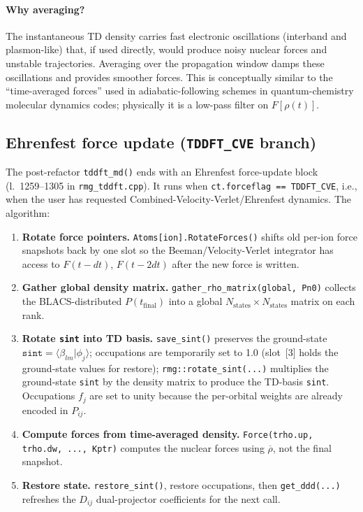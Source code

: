 \documentclass[11pt,letterpaper]{article}
\begin{document}
\paragraph{Why averaging?}  The instantaneous TD density carries fast
electronic oscillations (interband and plasmon-like) that, if used
directly, would produce noisy nuclear forces and unstable trajectories.
Averaging over the propagation window damps these oscillations and
provides smoother forces.  This is conceptually similar to the
``time-averaged forces'' used in adiabatic-following schemes in
quantum-chemistry molecular dynamics codes; physically it is a low-pass
filter on $F[\rho(t)]$.

\subsection{Ehrenfest force update (\texttt{TDDFT\_CVE} branch)}
\label{sec:cve}

The post-refactor \texttt{tddft\_md()} ends with an Ehrenfest force-update
block (l.~1259--1305 in \texttt{rmg\_tddft.cpp}).  It runs when
\texttt{ct.forceflag == TDDFT\_CVE}, i.e., when the user has requested
Combined-Velocity-Verlet/Ehrenfest dynamics.  The algorithm:

\begin{enumerate}[leftmargin=*]
\item \textbf{Rotate force pointers.}  \texttt{Atoms[ion].RotateForces()}
      shifts old per-ion force snapshots back by one slot so the
      Beeman/Velocity-Verlet integrator has access to $F(t-dt)$,
      $F(t-2dt)$ after the new force is written.
\item \textbf{Gather global density matrix.}
      \texttt{gather\_rho\_matrix(global, Pn0)} collects the
      BLACS-distributed $P(t_\text{final})$ into a global
      $N_\text{states} \times N_\text{states}$ matrix on each rank.
\item \textbf{Rotate \texttt{sint} into TD basis.}
      \texttt{save\_sint()} preserves the ground-state
      $\texttt{sint} = \langle \beta_{lm} | \phi_j \rangle$;
      occupations are temporarily set to 1.0 (slot~[3] holds the
      ground-state values for restore);
      \texttt{rmg::rotate\_sint(...)} multiplies the ground-state
      \texttt{sint} by the density matrix to produce the TD-basis
      \texttt{sint}.  Occupations $f_j$ are set to unity because the
      per-orbital weights are already encoded in $P_{ij}$.
\item \textbf{Compute forces from time-averaged density.}
      \texttt{Force(trho.up, trho.dw, ..., Kptr)} computes the nuclear
      forces using $\overline{\rho}$, not the final snapshot.
\item \textbf{Restore state.}  \texttt{restore\_sint()}, restore
      occupations, then \texttt{get\_ddd(...)} refreshes the $D_{ij}$
      dual-projector coefficients for the next call.
\end{enumerate}
\end{document}
